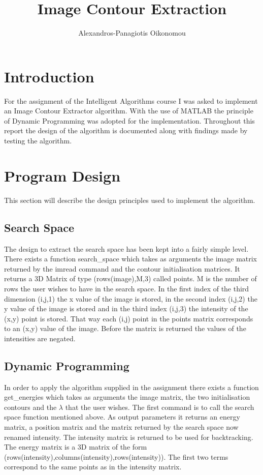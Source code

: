 \documentclass[12pt,a4paper,twocolumn]{article}
\author{Alexandros-Panagiotis Oikonomou}
\title{Image Contour Extraction}
\begin{document}
\maketitle
\newpage
\thispagestyle{empty}
\mbox{}
\newpage
\thispagestyle{empty}
\mbox{}
\newpage
\thispagestyle{empty}
\mbox{}
\section{Introduction}
For the assignment of the Intelligent Algorithms course I was asked to implement an Image Contour Extractor algorithm. With the use of MATLAB the principle of Dynamic Programming was adopted for the implementation. Throughout this report the design of the algorithm is documented along with findings made by testing the algorithm. 
\section{Program Design}
This section will describe the design principles used to implement the algorithm.
\subsection{Search Space}
The design to extract the search space has been kept into a fairly simple level. There exists a function search\_space which takes as arguments the image matrix returned by the imread command and the contour initialisation matrices. It returns a 3D Matrix of type (rows(image),M,3) called points. M is the number of rows the user wishes to have in the search space. In the first index of the third dimension (i,j,1) the x value of the image is stored, in the second index (i,j,2) the y value of the image is stored and in the third index (i,j,3) the intensity of the (x,y) point is stored. That way each (i,j) point in the points matrix corresponds to an (x,y) value of the image. Before the matrix is returned the values of the intensities are negated.
\subsection{Dynamic Programming}
In order to apply the algorithm supplied in the assignment there exists a function get\_energies which takes as arguments the image matrix, the two initialisation contours and the $\lambda$ that the user wishes. The first command is to call the search space function mentioned above. As output parameters it returns an energy matrix, a position matrix and the matrix returned by the search space now renamed intensity. The intensity matrix is returned to be used for backtracking. The energy matrix is a 3D matrix of the form (rows(intensity),columns(intensity),rows(intensity)).
The first two terms correspond to the same points as in the intensity matrix. 
\end{document}
